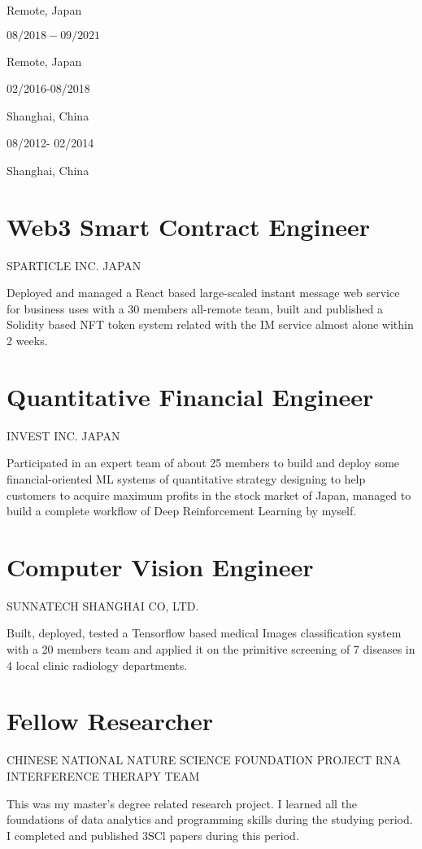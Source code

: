 \documentclass[10pt]{article}
\begin{document}
Remote, Japan

$08 / 2018-09 / 2021$

Remote, Japan

02/2016-08/2018

Shanghai, China

08/2012- 02/2014

Shanghai, China

\section*{Web3 Smart Contract Engineer}
SPARTICLE INC. JAPAN

Deployed and managed a React based large-scaled instant message web service for business uses with a 30 members all-remote team, built and published a Solidity based NFT token system related with the IM service almost alone within 2 weeks.

\section*{Quantitative Financial Engineer}
INVEST INC. JAPAN

Participated in an expert team of about 25 members to build and deploy some financial-oriented ML systems of quantitative strategy designing to help customers to acquire maximum profits in the stock market of Japan, managed to build a complete workflow of Deep Reinforcement Learning by myself.

\section*{Computer Vision Engineer}
SUNNATECH SHANGHAI CO, LTD.

Built, deployed, tested a Tensorflow based medical Images classification system with a 20 members team and applied it on the primitive screening of 7 diseases in 4 local clinic radiology departments.

\section*{Fellow Researcher}
CHINESE NATIONAL NATURE SCIENCE FOUNDATION PROJECT RNA INTERFERENCE THERAPY TEAM

This was my master's degree related research project. I learned all the foundations of data analytics and programming skills during the studying period. I completed and published $3 \mathrm{SCl}$ papers during this period.
\end{document}
